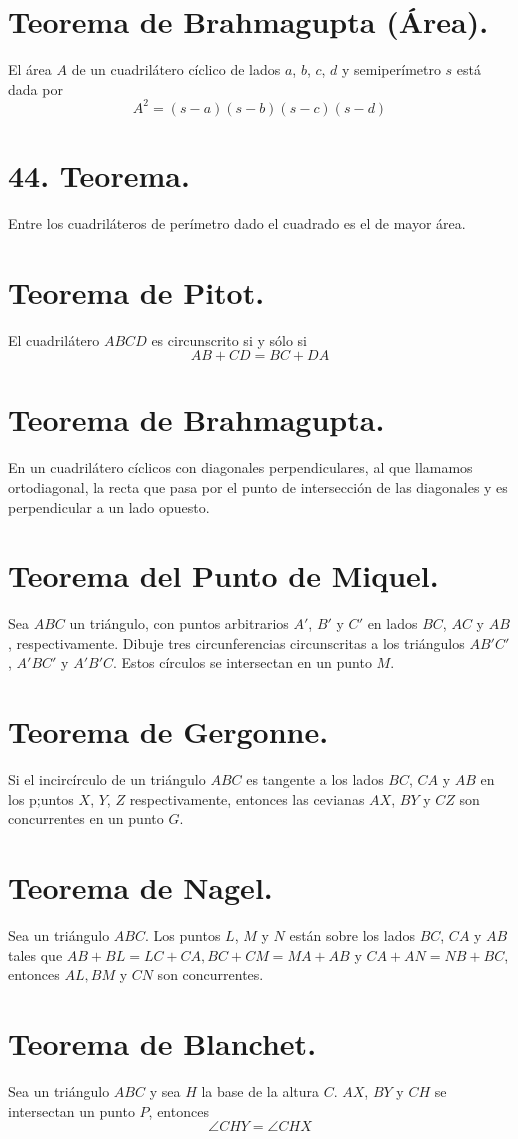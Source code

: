 \documentclass[12pt,a4paper,oneside]{book}
\begin{document}
\section{Teorema de Brahmagupta (Área).}
El área $A$ de un cuadrilátero cíclico de lados $a$, $b$, $c$, $d$ y semiperímetro $s$ está dada por $$A^2=(s-a)(s-b)(s-c)(s-d)$$
\section{44. Teorema.}
Entre los cuadriláteros de perímetro dado el cuadrado es el de mayor área.
\section{Teorema de Pitot.}
El cuadrilátero $ABCD$ es circunscrito si y sólo si $$AB + CD = BC +DA$$
\section{Teorema de Brahmagupta.}
En un cuadrilátero cíclicos con diagonales perpendiculares, al que llamamos ortodiagonal, la recta que pasa por el punto de intersección de las diagonales y es perpendicular a un lado opuesto.
\section{Teorema del Punto de Miquel.}
Sea $ABC$ un triángulo, con puntos arbitrarios $A'$, $B'$ y $C'$ en lados $BC$, $AC$ y $AB$ , respectivamente. Dibuje tres circunferencias circunscritas a los triángulos $AB'C'$, $A'BC'$ y $A'B'C$. Estos círculos se intersectan en un punto $M$.
\section{Teorema de Gergonne.}
Si el incircírculo de un triángulo $ABC$ es tangente a los lados $BC$, $CA$ y $AB$ en los p;untos $X$, $Y$, $Z$ respectivamente, entonces las cevianas  $AX$, $BY$ y $CZ$ son concurrentes en un punto $G.$
\section{Teorema de Nagel.}
Sea un triángulo $ABC$. Los puntos $L$, $M$ y $N$ están sobre los lados $BC$, $CA$ y $AB$ tales que $AB + BL = LC + CA, BC + CM= MA + AB$ y $CA + AN= NB + BC$, entonces $AL, BM$ y $CN$ son concurrentes.
\section{Teorema de Blanchet.}
Sea un triángulo $ABC$ y sea $H$ la base de la altura $C$. $AX$, $BY$ y $CH$ se intersectan un punto $P$, entonces $$\angle CHY = \angle CHX$$
\end{document}
